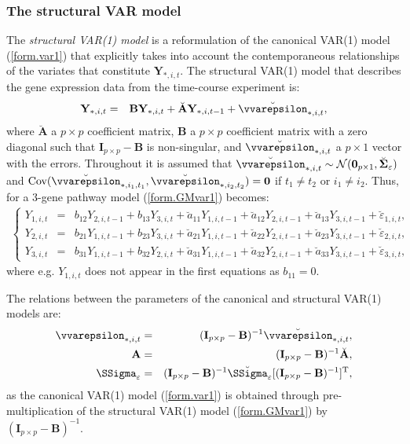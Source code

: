 \documentclass[a4paper]{article}
\theoremstyle{myexamplestyle}
\begin{document}
\subsubsection{The structural VAR model}
The \textit{structural VAR(1) model} is a reformulation of the canonical VAR(1) model (\ref{form.var1}) that explicitly takes into account the contemporaneous relationships of the variates that constitute $\mathbf{Y}_{\ast, i, t}$. The structural VAR(1) model that describes the gene expression data from the time-course experiment is:
\begin{eqnarray} \label{form.GMvar1}
\mathbf{Y}_{\ast, i, t} %
& = & \mathbf{B} \mathbf{Y}_{\ast, i, t} + \breve{\mathbf{A}} \mathbf{Y}_{\ast, i, t-1} + \breve{\vvarepsilon}_{\ast, i, t},
\end{eqnarray}
where $\breve{\mathbf{A}}$ a $p \times p$ coefficient matrix, $\mathbf{B}$ a $p \times p$ coefficient matrix with a zero diagonal such that $\mathbf{I}_{p \times p} - \mathbf{B}$ is non-singular, and $\breve{\vvarepsilon}_{\ast,i,t}$ a $p \times 1$ vector with the errors. Throughout it is assumed that $\breve{\vvarepsilon}_{\ast,i,t} \sim \mathcal{N}(\mathbf{0}_{p \times 1}, \breve{\mathbf{\Sigma}}_{\varepsilon})$ and $\mbox{Cov}(\breve{\vvarepsilon}_{\ast,i_1,t_1}, \breve{\vvarepsilon}_{\ast,i_2,t_2}) = \mathbf{0}$ if $t_1 \not=t_2$ or $i_1 \not=i_2$. Thus, for a 3-gene pathway model (\ref{form.GMvar1}) becomes:
\begin{eqnarray*}
\left\{
\begin{array}{ccc}
Y_{1,i,t} & = & b_{12} Y_{2,i,t-1} + b_{13} Y_{3,i,t} + \breve{a}_{11} Y_{1,i,t-1} + \breve{a}_{12} Y_{2,i,t-1} + \breve{a}_{13} Y_{3,i,t-1} + \breve{\varepsilon}_{1,i,t},
\\
Y_{2,i,t} & = & b_{21} Y_{1,i,t-1} + b_{23} Y_{3,i,t} + \breve{a}_{21} Y_{1,i,t-1} + \breve{a}_{22} Y_{2,i,t-1} + \breve{a}_{23} Y_{3,i,t-1} + \breve{\varepsilon}_{2,i,t},
\\
Y_{3,i,t} & = & b_{31} Y_{1,i,t-1} + b_{32} Y_{2,i,t} + \breve{a}_{31} Y_{1,i,t-1} + \breve{a}_{32} Y_{2,i,t-1} + \breve{a}_{33} Y_{3,i,t-1} + \breve{\varepsilon}_{3,i,t},
\end{array}
\right.
\end{eqnarray*}
where e.g. $Y_{1,i,t}$ does not appear in the first equations as $b_{11} = 0$.

The relations between the parameters of the canonical and structural VAR(1) models are:
\begin{eqnarray*}
\vvarepsilon_{\ast, i, t} & = & (\mathbf{I}_{p \times p} - \mathbf{B})^{-1} \breve{\vvarepsilon}_{\ast, i, t},
\\
\mathbf{A} & = & (\mathbf{I}_{p \times p} - \mathbf{B})^{-1} \breve{\mathbf{A}},
\\
\SSigma_{\varepsilon}  & = & (\mathbf{I}_{p \times p} - \mathbf{B})^{-1} \breve{\SSigma}_{\varepsilon}
[(\mathbf{I}_{p \times p} - \mathbf{B})^{-1}]^{\mathrm{T}},
\end{eqnarray*}
as the canonical VAR(1) model (\ref{form.var1}) is obtained through pre-multiplication of the structural VAR(1) model (\ref{form.GMvar1})
by $(\mathbf{I}_{p \times p} - \mathbf{B})^{-1}$.
\end{document}
